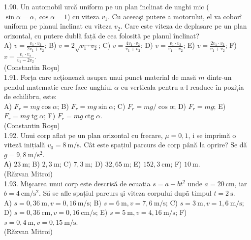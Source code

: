 \documentclass[10pt]{article}
\begin{document}
1.90. Un automobil urcă uniform pe un plan înclinat de unghi mic ($\sin \alpha=\alpha, \cos \alpha=1$) cu viteza $v_{1}$. Cu aceeaşi putere a motorului, el va coborî uniform pe planul înclinat cu viteza $v_{2}$. Care este viteza de deplasare pe un plan orizontal, cu putere dublă față de cea folosită pe planul înclinat?\\ A) $v=\frac{v_{1} \cdot v_{2}}{2 v_{1}+v_{2}}$; B) $v=2 \sqrt{v_{1} \cdot v_{2}}$; C) $v=\frac{4 v_{1} \cdot v_{2}}{v_{1}+v_{2}}$; D) $v=\frac{v_{1} \cdot v_{2}}{v_{1}-v_{2}}$; E) $v=\frac{2 v_{1} \cdot v_{2}}{v_{1}+v_{2}}$; F) $v=\frac{v_{1} \cdot v_{2}}{v_{1}-2 v_{2}}$.\\ (Constantin Roşu)\\

1.91. Forța care acționează asupra unui punct material de masă $m$ dintr-un pendul matematic care face unghiul $\alpha$ cu verticala pentru a-l readuce în poziția de echilibru, este:\\ A) $F_{r}=m g \cos \alpha$; B) $F_{r}=m g \sin \alpha$; C) $F_{r}=m g / \cos \alpha$; D) $F_{r}=m g$; E) $F_{r}=m g \operatorname{tg} \alpha$; F) $F_{r}=m g \operatorname{ctg} \alpha$.\\ (Constantin Roşu)\\

1.92. Unui corp aflat pe un plan orizontal cu frecare, $\mu=0,1$, i se imprimă o viteză inițială $v_{0}=8 \mathrm{~m} / \mathrm{s}$. Cât este spațiul parcurs de corp până la oprire? Se dă $g=9,8 \mathrm{~m} / \mathrm{s}^{2}$.\\ А) $23 \mathrm{~m}$; B) $2,3 \mathrm{~m}$; C) $7,3 \mathrm{~m}$; D) $32,65 \mathrm{~m}$; E) $152,3 \mathrm{~cm}$; F) $10 \mathrm{~m}$.\\ (Răzvan Mitroi)\\

1.93. Mişcarea unui corp este descrisă de ecuația $s=a+b t^{2}$ unde $a=20 \mathrm{~cm}$, iar $b=4 \mathrm{~cm} / \mathrm{s}^{2}$. Să se afle spațiul parcurs şi viteza corpului dupã timpul $t=2 \mathrm{~s}$.\\ A) $s=0,36 \mathrm{~m}, v=0,16 \mathrm{~m} / \mathrm{s}$; B) $s=6 \mathrm{~m}, v=7,6 \mathrm{~m} / \mathrm{s}$; C) $s=3 \mathrm{~m}, v=1,6 \mathrm{~m} / \mathrm{s}$; D) $s=0,36 \mathrm{~cm}, v=0,16 \mathrm{~cm} / \mathrm{s}$; E) $s=5 \mathrm{~m}, v=4,16 \mathrm{~m} / \mathrm{s}$; F) $s=0,4 \mathrm{~m}, v=0,15 \mathrm{~m} / \mathrm{s}$.\\ (Răzvan Mitroi)\\
\end{document}

